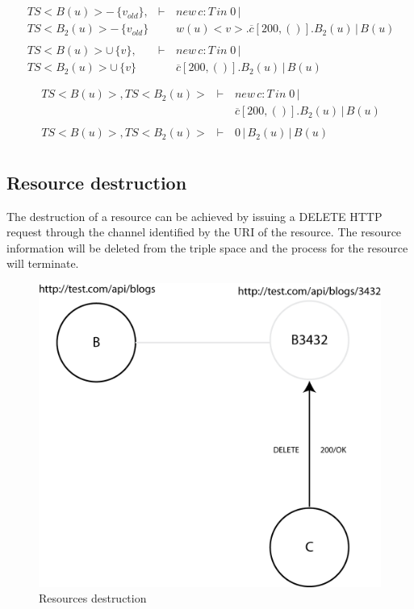 \begin{eqnarray*}
 \               &        &          \\
 \ TS<B(u)> - \,\{ v_{old} \},        &\vdash\,& new\,c:T\,in\;0\,|\,\\
 \ TS<B_2(u)> - \,\{ v_{old} \}              &      & w(u)<v>.\overline{c}[200,()].B_2(u)\,|\,B(u)\\
 \               &        &          \\
 \ TS<B(u)> \cup \,\{v\},        &\vdash\,& new\,c:T\,in\;0\,|\,\\
 \ TS<B_2(u)> \cup \,\{v\}              &      & \overline{c}[200,()].B_2(u)\,|\,B(u)\\
 \               &        &          \\
\end{eqnarray*}
\begin{eqnarray*}
 \ TS<B(u)>,TS<B_2(u)>         &\vdash\,& new\,c:T\,in\;0\,|\,\\
 \               &      & \overline{c}[200,()].B_2(u)\,|\,B(u)\\
 \               &       &          \\
 \ TS<B(u)>,TS<B_2(u)>         &\vdash\,& 0\,|\,B_2(u)\,|\,B(u)\\
\end{eqnarray*}


\subsection{Resource destruction}

The destruction of a resource can be achieved by issuing a DELETE HTTP request through the channel identified by the URI of the resource. The resource information will be deleted from the triple space and the process for the resource will terminate.

\begin{figure}[htb!]
\centering%
\includegraphics{get_del.png}
\caption{Resources destruction}
\end{figure}

